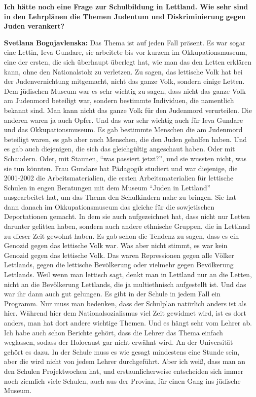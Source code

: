 \textbf{Ich hätte noch eine Frage zur Schulbildung in Lettland. Wie sehr sind in den Lehrplänen die Themen Judentum und Diskriminierung gegen Juden verankert?}

\textbf{Svetlana Bogojavlenska:} Das Thema ist auf jeden Fall präsent. Es war sogar eine Lettin, Ieva Gundare, sie arbeitete bis vor kurzem im Okkupationsmuseum, eine der ersten, die sich überhaupt überlegt hat, wie man das den Letten erklären kann, ohne den Nationalstolz zu verletzen. Zu sagen, das lettische Volk hat bei der Judenvernichtung mitgemacht, nicht das ganze Volk, sondern einige Letten. Dem jüdischen Museum war es sehr wichtig zu sagen, dass nicht das ganze Volk am Judenmord beteiligt war, sondern bestimmte Individuen, die namentlich bekannt sind. Man kann nicht das ganze Volk für den Judenmord verurteilen. Die anderen waren ja auch Opfer. Und das war sehr wichtig auch für Ieva Gundare und das Okkupationsmuseum. Es gab bestimmte Menschen die am Judenmord beteiligt waren, es gab aber auch Menschen, die den Juden geholfen haben. Und es gab auch diejenigen, die sich das gleichgültig angeschaut haben. Oder mit Schaudern. Oder, mit Staunen, "`was passiert jetzt?"', und sie wussten nicht, was sie tun könnten. Frau Gundare hat Pädagogik studiert und war diejenige, die 2001-2002 die Arbeitsmaterialien, die ersten Arbeitsmaterialien für lettische Schulen in engen Beratungen mit dem Museum "`Juden in Lettland"' ausgearbeitet hat, um das Thema den Schulkindern nahe zu bringen. Sie hat dann danach im Okkupationsmuseum das gleiche für die sowjetischen Deportationen gemacht. In dem sie auch aufgezeichnet hat, dass nicht nur Letten darunter gelitten haben, sondern auch andere ethnische Gruppen, die in Lettland zu dieser Zeit gewohnt haben.
Es gab schon die Tendenz zu sagen, dass es ein Genozid gegen das lettische Volk war. Was aber nicht stimmt, es war kein Genozid gegen das lettische Volk. Das waren Repressionen gegen alle Völker Lettlands, gegen die lettische Bevölkerung oder vielmehr gegen Bevölkerung Lettlands. Weil wenn man lettisch sagt, denkt man in Lettland nur an die Letten, nicht an die Bevölkerung Lettlands, die ja multiethnisch aufgestellt ist. Und das war ihr dann auch gut gelungen.
Es gibt in der Schule in jedem Fall ein Programm. Nur muss man bedenken, dass der Schulplan natürlich anders ist als hier. Während hier dem Nationalsozialismus viel Zeit gewidmet wird, ist es dort anders, man hat dort andere wichtige Themen. Und es hängt sehr vom Lehrer ab. Ich habe auch schon Berichte gehört, dass die Lehrer das Thema einfach weglassen, sodass der Holocaust gar nicht erwähnt wird. An der Universität gehört es dazu. In der Schule muss es wie gesagt mindestens eine Stunde sein, aber die wird nicht von jedem Lehrer durchgeführt. Aber ich weiß, dass man an den Schulen Projektwochen hat, und erstaunlicherweise entscheiden sich immer noch ziemlich viele Schulen, auch aus der Provinz, für einen Gang ins jüdische Museum.